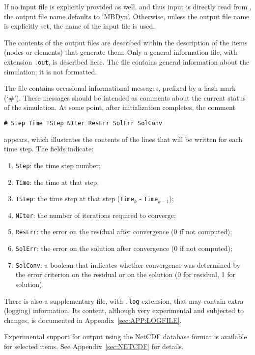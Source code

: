 If no input file is explicitly provided as well, and thus input
is directly read from , the output file name defaults
to `MBDyn'.
Otherwise, unless the output file name is explicitly set, the name 
of the input file is used.

The contents of the output files are described within the description
of the items (nodes or elements) that generate them.
Only a general information file, with extension \texttt{.out}, 
is described here. 
The file contains general information about the simulation; 
it is not formatted. 

The file contains occasional informational messages,
prefixed by a hash mark (`\#').
These messages should be intended as comments about the current status
of the simulation.
At some point, after initialization completes, the comment
\begin{verbatim}
# Step Time TStep NIter ResErr SolErr SolConv
\end{verbatim}
appears, which illustrates the contents of the lines that will be written
for each time step.
The fields indicate:
\begin{enumerate}
\item \texttt{Step}: the time step number;
\item \texttt{Time}: the time at that step;
\item \texttt{TStep}: the time step at that step
	(\texttt{Time}$_k$ - \texttt{Time}$_{k-1}$);
\item \texttt{NIter}: the number of iterations required to converge;
\item \texttt{ResErr}: the error on the residual after convergence
	(0 if not computed);
\item \texttt{SolErr}: the error on the solution after convergence
	(0 if not computed);
\item \texttt{SolConv}: a boolean that indicates whether convergence
	was determined by the error criterion on the residual
	or on the solution (0 for residual, 1 for solution).
\end{enumerate}

There is also a supplementary file, with \texttt{.log} extension,
that may contain extra (logging) information.
Its content, although very experimental and subjected to changes,
is documented in Appendix~\ref{sec:APP:LOGFILE}.

\bigskip

Experimental support for output using the NetCDF database format
is available for selected items.
See Appendix~\ref{sec:NETCDF} for details.

